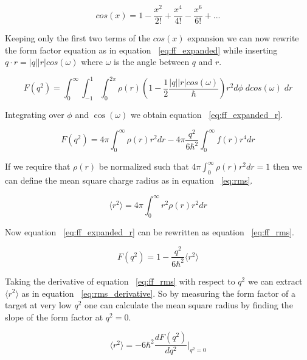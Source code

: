 \begin{equation} \label{eq:cos}
	cos(x) = 1 - \frac{x^2}{2!} + \frac{x^4}{4!} - \frac{x^6}{6!} +...
\end{equation}

\noindent Keeping only the first two terms of the $cos(x)$ expansion we can now rewrite the form factor equation as in equation ~\ref{eq:ff_expanded} while inserting $q \cdot r = |q||r|cos(\omega)$ where $\omega$ is the angle between $q$ and $r$.

\begin{equation} \label{eq:ff_expanded}
	F(q^2) = \int_0^\infty \int_{-1}^1 \int_0^{2\pi} \rho(r) \left( 1-\frac{1}{2} \frac{|q||r|cos(\omega)}{\hbar} \right) r^2 d\phi \; dcos(\omega) \; dr
\end{equation}

\noindent Integrating over $\phi$ and $\cos(\omega)$ we obtain equation ~\ref{eq:ff_expanded_r}.

\begin{equation} \label{eq:ff_expanded_r}
	F(q^2) = 4\pi \int_0^\infty \rho(r) r^2 dr - 4\pi \frac{q^2}{6\hbar^2} \int_0^\infty f(r) r^4 dr
\end{equation}

If we require that $\rho(r)$ be normalized such that $4\pi \int_0^\infty \rho(r) r^2 dr = 1$ then we can define the mean square charge radius as in equation ~\ref{eq:rms}.

\begin{equation} \label{eq:rms}
	\langle r^2 \rangle = 4\pi \int_0^\infty r^2 \rho(r) r^2 dr
\end{equation}

\noindent Now equation ~\ref{eq:ff_expanded_r} can be rewritten as equation ~\ref{eq:ff_rms}.

\begin{equation} \label{eq:ff_rms}
	F(q^2) = 1 - \frac{q^2}{6\hbar^2} \langle r^2 \rangle
\end{equation}

\noindent Taking the derivative of equation ~\ref{eq:ff_rms} with respect to $q^2$ we can extract $\langle r^2 \rangle$ as in equation ~\ref{eq:rms_derivative}. So by measuring the form factor of a target at very low $q^2$ one can calculate the mean square radius by finding the slope of the form factor at $q^2=0$.

\begin{equation} \label{eq:rms_derivative}
	\langle r^2 \rangle = -6\hbar^2 \frac{dF(q^2)}{dq^2} |_{q^2=0}
\end{equation}

